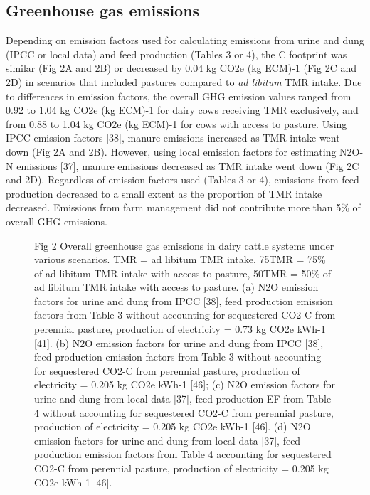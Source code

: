 \documentclass[11pt,a4paper]{article}
\begin{document}
\subsection{Greenhouse gas emissions}

Depending on emission factors used for calculating emissions from urine and dung (IPCC or local data) and feed production (Tables 3 or 4), the C footprint was similar (Fig 2A and 2B) or decreased by 0.04 kg CO2e (kg ECM)-1 (Fig 2C and 2D) in scenarios that included pastures compared to \textit{ad libitum} TMR intake. Due to differences in emission factors, the overall GHG emission values ranged from 0.92 to 1.04 kg CO2e (kg ECM)-1 for dairy cows receiving TMR exclusively, and from 0.88 to 1.04 kg CO2e (kg ECM)-1 for cows with access to pasture. Using IPCC emission factors [38], manure emissions increased as TMR intake went down (Fig 2A and 2B). However, using local emission factors for estimating N2O-N emissions [37], manure emissions decreased as TMR intake went down (Fig 2C and 2D). Regardless of emission factors used (Tables 3 or 4), emissions from feed production decreased to a small extent as the proportion of TMR intake decreased. Emissions from farm management did not contribute more than 5\% of overall GHG emissions.

\begin{figure}[h]
\caption{Fig 2 Overall greenhouse gas emissions in dairy cattle systems under various scenarios. TMR = ad libitum TMR intake, 75TMR = 75\% of ad libitum TMR intake with access to pasture, 50TMR = 50\% of ad libitum TMR intake with access to pasture. (a) N2O emission factors for urine and dung from IPCC [38], feed production emission factors from Table 3 without accounting for sequestered CO2-C from perennial pasture, production of electricity = 0.73 kg CO2e kWh-1 [41]. (b) N2O emission factors for urine and dung from IPCC [38], feed production emission factors from Table 3 without accounting for sequestered CO2-C from perennial pasture, production of electricity = 0.205 kg CO2e kWh-1 [46]; (c) N2O emission factors for urine and dung from local data [37], feed production EF from Table 4 without accounting for sequestered CO2-C from perennial pasture, production of electricity = 0.205 kg CO2e kWh-1 [46]. (d) N2O emission factors for urine and dung from local data [37], feed production emission factors from Table 4 accounting for sequestered CO2-C from perennial pasture, production of electricity = 0.205 kg CO2e kWh-1 [46].}
\end{figure}
\end{document}
